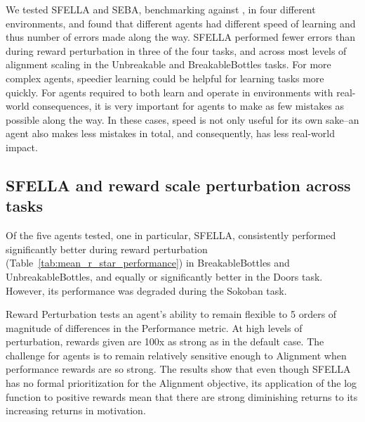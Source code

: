 


We tested SFELLA and SEBA, benchmarking against \tloA{}, in four different environments, and found that different agents had different speed of learning and thus number of errors made along the way. SFELLA performed fewer errors than \tloA{} during reward perturbation in three of the four tasks, and across most levels of alignment scaling in the Unbreakable and BreakableBottles tasks. For more complex agents, speedier learning could be helpful for learning tasks more quickly. For agents required to both learn and operate in environments with real-world consequences, it is very important for agents to make as few mistakes as possible along the way. In these cases, speed is not only useful for its own sake--an agent also makes less mistakes in total, and consequently, has less real-world impact.

\subsection{SFELLA and reward scale perturbation across tasks}

Of the five agents tested, one in particular, SFELLA, consistently performed significantly better during reward perturbation (Table~\ref{tab:mean_r_star_performance}) in BreakableBottles and UnbreakableBottles, and equally or significantly better in the Doors task. However, its performance was degraded during the Sokoban task.

Reward Perturbation tests an agent's ability to remain flexible to 5 orders of magnitude of differences in the Performance metric. At high levels of perturbation, rewards given are 100x as strong as in the default case. The challenge for agents is to remain relatively sensitive enough to Alignment when performance rewards are so strong. The results show that even though SFELLA has no formal prioritization for the Alignment objective, its application of the log function to positive rewards mean that there are strong diminishing returns to its increasing returns in motivation.

